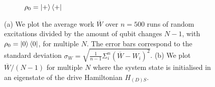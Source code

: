 \begin{figure}[h]
\begin{subfigure}{0.4\textwidth}
	\caption{$\rho_0 = \ket{+}\bra{+}$}
	\label{dt_eigen}
	\end{subfigure}
	\caption{(a) We plot the average work $\overline{W}$ over $n = 500$ runs of random excitations divided by the amount of qubit changes $N - 1$, with $\rho_0 = \ket{0}\bra{0}$, for multiple $N$. The error bars correspond to the standard deviation $\sigma_{W} = \sqrt{\frac{1}{n-1} \Sigma_i^n (\overline{W} - W_i)^2}$.
	(b) We plot $\overline{W}/(N-1)$ for multiple $N$ where the system state is initialised in an eigenstate of the drive Hamiltonian $H_{(D)S}$.}
	\label{dt_dep}
\end{figure}